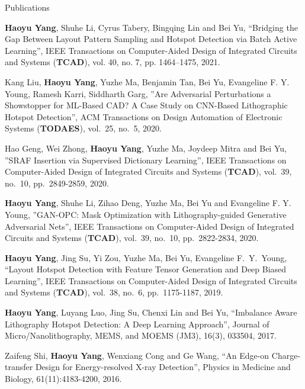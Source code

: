 \begin{rSection}{Publications}
\begin{description}[font=\normalfont]
\item[{[J7]}]{
	\textbf{Haoyu Yang}, Shuhe Li, Cyrus Tabery, Bingqing Lin and Bei Yu, ``Bridging the Gap Between Layout Pattern Sampling and Hotspot Detection via Batch Active Learning'', IEEE Transactions on Computer-Aided Design of Integrated Circuits and Systems (\textbf{TCAD}),  vol. 40, no. 7, pp. 1464–1475, 2021.
}	

\item[{[J6]}]{
	Kang Liu, \textbf{Haoyu Yang}, Yuzhe Ma, Benjamin Tan, Bei Yu, Evangeline F. Y. Young, Ramesh Karri, Siddharth Garg, ''Are Adversarial Perturbations a Showstopper for ML-Based CAD? A Case Study on CNN-Based Lithographic Hotspot Detection'', ACM Transactions on Design Automation of Electronic Systems (\textbf{TODAES}), vol.~25, no.~5, 2020.
}	
	
\item[{[J5]}]{
	Hao Geng, Wei Zhong, \textbf{Haoyu Yang}, Yuzhe Ma, Joydeep Mitra and Bei Yu, ''SRAF Insertion via Supervised Dictionary Learning'', IEEE Transactions on Computer-Aided Design of Integrated Circuits and Systems (\textbf{TCAD}), vol.~39, no.~10, pp.~2849-2859, 2020.
}	
	
\item[{[J4]}]{
	\textbf{Haoyu Yang}, Shuhe Li, Zihao Deng, Yuzhe Ma, Bei Yu and Evangeline F. Y. Young, ''GAN-OPC: Mask Optimization with Lithography-guided Generative Adversarial Nets'', IEEE Transactions on Computer-Aided Design of Integrated Circuits and Systems (\textbf{TCAD}), vol.~39, no.~10, pp.~2822-2834, 2020.
}

\item[{[J3]}]{
	\textbf{Haoyu Yang}, Jing Su, Yi Zou, Yuzhe Ma, Bei Yu, Evangeline F.~Y.~Young, ``Layout Hotspot Detection with Feature Tensor Generation and Deep Biased Learning'', IEEE Transactions on Computer-Aided Design of Integrated Circuits and Systems (\textbf{TCAD}), vol.~38, no.~6, pp.~1175-1187, 2019.
}
	
\item[{[J2]}]{
	\textbf{Haoyu Yang}, Luyang Luo, Jing Su, Chenxi Lin and Bei Yu, ``Imbalance Aware Lithography Hotspot Detection: A Deep Learning Approach'', Journal of Micro/Nanolithography, MEMS, and MOEMS (JM3), 16(3), 033504, 2017.
}

\item[{[J1]}]{
    Zaifeng Shi, \textbf{Haoyu Yang}, Wenxiang Cong and Ge Wang,
    ``An Edge-on Charge-transfer Design for Energy-resolved X-ray Detection'',
    Physics in Medicine and Biology, 61(11):4183-4200, 2016.
}


\end{description}
\end{rSection}
